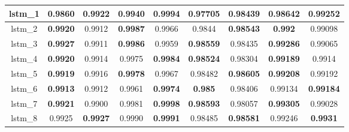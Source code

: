 \begin{table}[p]
\begin{tabular} {|c|c|c|c|c|c|c|c|c| }
        lstm\_1  & 0.9860                              & \textbf{0.9922}                     & 0.9940                      & \textbf{0.9994}                     & 0.97705                     & \textbf{0.98439}                     & 0.98642                              & \textbf{0.99252}            \\ \hline
        lstm\_2  & \textbf{0.9920}                     & 0.9912                              & \textbf{0.9987}             & 0.9966                              & 0.9844                      & \textbf{0.98543}                     & \textbf{0.992}                       & 0.99098                     \\ \hline
        lstm\_3  & \textbf{0.9927}                     & 0.9911                              & \textbf{0.9986}             & 0.9959                              & \textbf{0.98559}            & 0.98435                              & \textbf{0.99286}                     & 0.99065                     \\ \hline
        lstm\_4  & \textbf{0.9920}                     & 0.9914                              & 0.9975                      & \textbf{0.9984}                     & \textbf{0.98524}            & 0.98304                              & \textbf{0.99189}                     & 0.9914                      \\ \hline
        lstm\_5  & \textbf{0.9919}                     & 0.9916                              & \textbf{0.9978}             & 0.9967                              & 0.98482                     & \textbf{0.98605}                     & \textbf{0.99208}                     & 0.99192                     \\ \hline
        lstm\_6  & \textbf{0.9913}                     & 0.9912                              & 0.9961                      & \textbf{0.9974}                     & \textbf{0.985}              & 0.98406                              & 0.99134                              & \textbf{0.99184}            \\ \hline
        lstm\_7  & \textbf{0.9921}                     & 0.9900                              & 0.9981                      & \textbf{\cellcolor{green!50}0.9998} & \textbf{0.98593}            & 0.98057                              & \textbf{0.99305}                     & 0.99028                     \\ \hline
        lstm\_8  & 0.9925                              & \textbf{0.9927}                     & 0.9990                      & \textbf{0.9991}                     & 0.98485                     & \textbf{0.98581}                     & 0.99246                              & \textbf{0.9931}             \\ \hline

\end{tabular}
\end{table}
